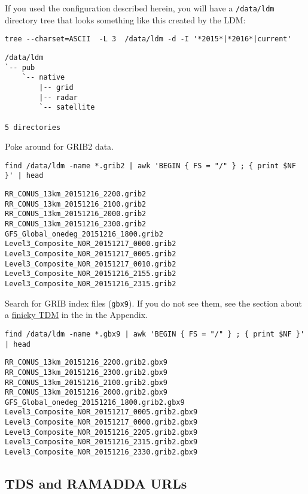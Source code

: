 \documentclass[onecolumn,9pt]{article}
\begin{document}
If you used the configuration described herein, you will have a \texttt{/data/ldm} directory tree that looks something like this created by the LDM:

\begin{verbatim}
tree --charset=ASCII  -L 3  /data/ldm -d -I '*2015*|*2016*|current'
\end{verbatim}

\begin{verbatim}
/data/ldm
`-- pub
    `-- native
        |-- grid
        |-- radar
        `-- satellite

5 directories
\end{verbatim}

Poke around for GRIB2 data.

\begin{verbatim}
find /data/ldm -name *.grib2 | awk 'BEGIN { FS = "/" } ; { print $NF }' | head
\end{verbatim}

\begin{verbatim}
RR_CONUS_13km_20151216_2200.grib2
RR_CONUS_13km_20151216_2100.grib2
RR_CONUS_13km_20151216_2000.grib2
RR_CONUS_13km_20151216_2300.grib2
GFS_Global_onedeg_20151216_1800.grib2
Level3_Composite_N0R_20151217_0000.grib2
Level3_Composite_N0R_20151217_0005.grib2
Level3_Composite_N0R_20151217_0010.grib2
Level3_Composite_N0R_20151216_2155.grib2
Level3_Composite_N0R_20151216_2315.grib2
\end{verbatim}

Search for GRIB index files (\texttt{gbx9}). If you do not see them, see the section about a \hyperref[orgtarget8]{finicky TDM} in the in the Appendix.

\begin{verbatim}
find /data/ldm -name *.gbx9 | awk 'BEGIN { FS = "/" } ; { print $NF }' | head
\end{verbatim}

\begin{verbatim}
RR_CONUS_13km_20151216_2200.grib2.gbx9
RR_CONUS_13km_20151216_2300.grib2.gbx9
RR_CONUS_13km_20151216_2100.grib2.gbx9
RR_CONUS_13km_20151216_2000.grib2.gbx9
GFS_Global_onedeg_20151216_1800.grib2.gbx9
Level3_Composite_N0R_20151217_0005.grib2.gbx9
Level3_Composite_N0R_20151217_0000.grib2.gbx9
Level3_Composite_N0R_20151216_2205.grib2.gbx9
Level3_Composite_N0R_20151216_2315.grib2.gbx9
Level3_Composite_N0R_20151216_2330.grib2.gbx9
\end{verbatim}

\subsection{TDS and RAMADDA URLs}
\label{sec:orgheadline45}
\end{document}
